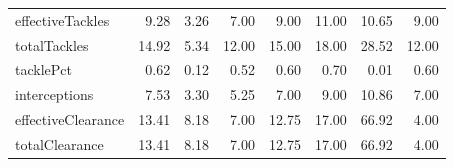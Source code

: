 \begin{table}[H]
\begin{tabular}{lrrrrrrr}
effectiveTackles & 9.28 & 3.26 & 7.00 & 9.00 & 11.00 & 10.65 & 9.00 \\
totalTackles & 14.92 & 5.34 & 12.00 & 15.00 & 18.00 & 28.52 & 12.00 \\
tacklePct & 0.62 & 0.12 & 0.52 & 0.60 & 0.70 & 0.01 & 0.60 \\
interceptions & 7.53 & 3.30 & 5.25 & 7.00 & 9.00 & 10.86 & 7.00 \\
effectiveClearance & 13.41 & 8.18 & 7.00 & 12.75 & 17.00 & 66.92 & 4.00 \\
totalClearance & 13.41 & 8.18 & 7.00 & 12.75 & 17.00 & 66.92 & 4.00 \\
\hline
\end{tabular}
\end{table}
